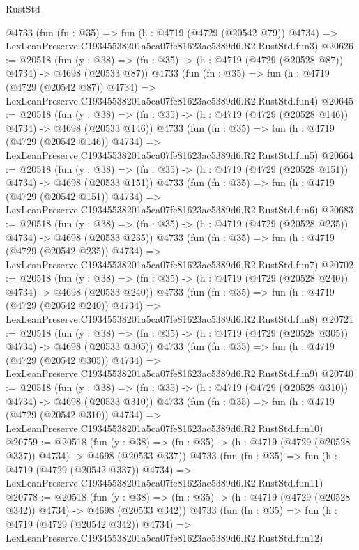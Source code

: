 \begin{lexlean}{RustStd}
\begin{coremodule}
    @4733
    (fun (fn : @35) =>
    fun (h : @4719 (@4729 (@20542 @79)) @4734) =>
    LexLeanPreserve.C19345538201a5ca07fe81623ac5389d6.R2.RustStd.fun3)
@20626 := @20518
    (fun (y : @38) => (fn : @35) -> (h : @4719 (@4729 (@20528 @87)) @4734) -> @4698 (@20533 @87))
    @4733
    (fun (fn : @35) =>
    fun (h : @4719 (@4729 (@20542 @87)) @4734) =>
    LexLeanPreserve.C19345538201a5ca07fe81623ac5389d6.R2.RustStd.fun4)
@20645 := @20518
    (fun (y : @38) => (fn : @35) -> (h : @4719 (@4729 (@20528 @146)) @4734) -> @4698 (@20533 @146))
    @4733
    (fun (fn : @35) =>
    fun (h : @4719 (@4729 (@20542 @146)) @4734) =>
    LexLeanPreserve.C19345538201a5ca07fe81623ac5389d6.R2.RustStd.fun5)
@20664 := @20518
    (fun (y : @38) => (fn : @35) -> (h : @4719 (@4729 (@20528 @151)) @4734) -> @4698 (@20533 @151))
    @4733
    (fun (fn : @35) =>
    fun (h : @4719 (@4729 (@20542 @151)) @4734) =>
    LexLeanPreserve.C19345538201a5ca07fe81623ac5389d6.R2.RustStd.fun6)
@20683 := @20518
    (fun (y : @38) => (fn : @35) -> (h : @4719 (@4729 (@20528 @235)) @4734) -> @4698 (@20533 @235))
    @4733
    (fun (fn : @35) =>
    fun (h : @4719 (@4729 (@20542 @235)) @4734) =>
    LexLeanPreserve.C19345538201a5ca07fe81623ac5389d6.R2.RustStd.fun7)
@20702 := @20518
    (fun (y : @38) => (fn : @35) -> (h : @4719 (@4729 (@20528 @240)) @4734) -> @4698 (@20533 @240))
    @4733
    (fun (fn : @35) =>
    fun (h : @4719 (@4729 (@20542 @240)) @4734) =>
    LexLeanPreserve.C19345538201a5ca07fe81623ac5389d6.R2.RustStd.fun8)
@20721 := @20518
    (fun (y : @38) => (fn : @35) -> (h : @4719 (@4729 (@20528 @305)) @4734) -> @4698 (@20533 @305))
    @4733
    (fun (fn : @35) =>
    fun (h : @4719 (@4729 (@20542 @305)) @4734) =>
    LexLeanPreserve.C19345538201a5ca07fe81623ac5389d6.R2.RustStd.fun9)
@20740 := @20518
    (fun (y : @38) => (fn : @35) -> (h : @4719 (@4729 (@20528 @310)) @4734) -> @4698 (@20533 @310))
    @4733
    (fun (fn : @35) =>
    fun (h : @4719 (@4729 (@20542 @310)) @4734) =>
    LexLeanPreserve.C19345538201a5ca07fe81623ac5389d6.R2.RustStd.fun10)
@20759 := @20518
    (fun (y : @38) => (fn : @35) -> (h : @4719 (@4729 (@20528 @337)) @4734) -> @4698 (@20533 @337))
    @4733
    (fun (fn : @35) =>
    fun (h : @4719 (@4729 (@20542 @337)) @4734) =>
    LexLeanPreserve.C19345538201a5ca07fe81623ac5389d6.R2.RustStd.fun11)
@20778 := @20518
    (fun (y : @38) => (fn : @35) -> (h : @4719 (@4729 (@20528 @342)) @4734) -> @4698 (@20533 @342))
    @4733
    (fun (fn : @35) =>
    fun (h : @4719 (@4729 (@20542 @342)) @4734) =>
    LexLeanPreserve.C19345538201a5ca07fe81623ac5389d6.R2.RustStd.fun12)

\end{coremodule}
\end{lexlean}
